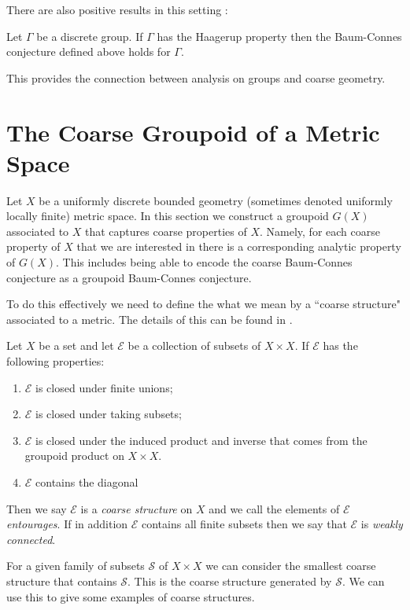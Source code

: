 There are also positive results in this setting \cite{MR1487204}:

\begin{theorem}
Let $\Gamma$ be a discrete group. If $\Gamma$ has the Haagerup property then the Baum-Connes conjecture defined above holds for $\Gamma$.
\end{theorem}

This provides the connection between analysis on groups and coarse geometry.

\section{The Coarse Groupoid of a Metric Space}\label{Sect:CG}

Let $X$ be a uniformly discrete bounded geometry (sometimes denoted uniformly locally finite) metric space. In this section we construct a groupoid $G(X)$ associated to $X$ that captures coarse properties of $X$. Namely, for each coarse property of $X$ that we are interested in there is a corresponding analytic property of $G(X)$. This includes being able to encode the coarse Baum-Connes conjecture as a groupoid Baum-Connes conjecture.

To do this effectively we need to define the what we mean by a ``coarse structure" associated to a metric. The details of this can be found in \cite{MR2007488}.

\begin{definition}
Let $X$ be a set and let $\mathcal{E}$ be a collection of subsets of $X \times X$. If $\mathcal{E}$ has the following properties:
\begin{enumerate}
\item $\mathcal{E}$ is closed under finite unions;
\item $\mathcal{E}$ is closed under taking subsets;
\item $\mathcal{E}$ is closed under the induced product and inverse that comes from the groupoid product on $X \times X$.
\item $\mathcal{E}$ contains the diagonal
\end{enumerate}
Then we say $\mathcal{E}$ is a \textit{coarse structure} on $X$ and we call the elements of $\mathcal{E}$ \textit{entourages}. If in addition $\mathcal{E}$ contains all finite subsets then we say that $\mathcal{E}$ is \textit{weakly connected}.
\end{definition}

For a given family of subsets $\mathcal{S}$ of $X \times X$ we can consider the smallest coarse structure that contains $\mathcal{S}$. This is the coarse structure generated by $\mathcal{S}$. We can use this to give some examples of coarse structures.

